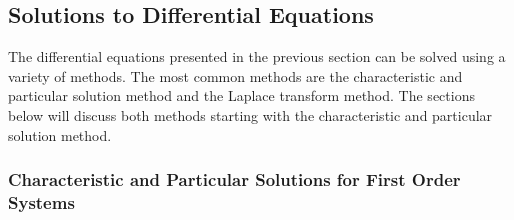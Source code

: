 \subsection{Solutions to Differential Equations}

The differential equations presented in the previous section can be solved using a variety of methods. The most common methods are the characteristic and particular solution method and the Laplace transform method. The sections below will discuss both methods starting with the characteristic and particular solution method.

\subsubsection{Characteristic and Particular Solutions for First Order Systems}

